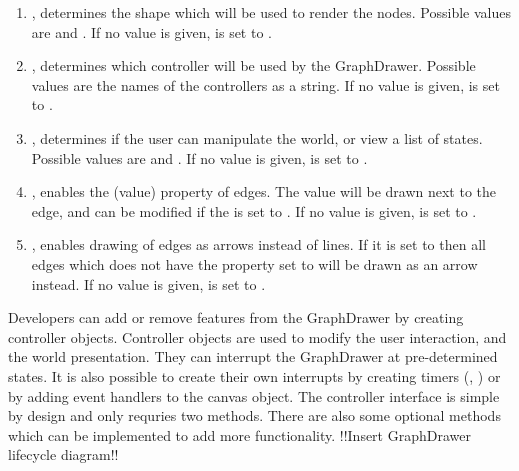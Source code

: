 \begin{enumerate}
    \item {}, determines the shape which will be used to render the nodes. Possible values are  and . If no value is given,  is set to .
    \item {}, determines which controller will be used by the GraphDrawer. Possible values are the names of the controllers as a string. If no value is given,  is set to .
    \item  {}, determines if the user can manipulate the world, or view a list of states. Possible values are  and . If no value is given,  is set to .
    \item {}, enables the  (value) property of edges. The value will be drawn next to the edge, and can be modified if the  is set to . If no value is given,  is set to .
    \item {}, enables drawing of edges as arrows instead of lines. If it is set to  then all edges which does not have the  property set to  will be drawn as an arrow instead. If no value is given,  is set to .
\end{enumerate}
Developers can add or remove features from the GraphDrawer by creating controller objects. Controller objects are used to modify the user interaction, and the world presentation. They can interrupt the GraphDrawer at pre-determined states. It is also possible to create their own interrupts by creating timers (, ) or by adding event handlers to the canvas object. The controller interface is simple by design and only requries two methods. There are also some optional methods which can be implemented to add more functionality.
!!Insert GraphDrawer lifecycle diagram!!
